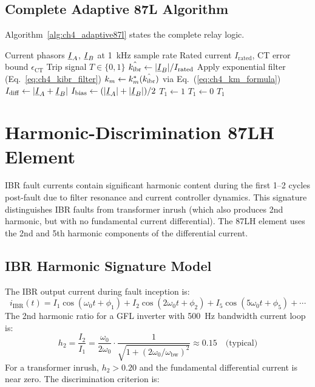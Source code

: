 \subsection{Complete Adaptive 87L Algorithm}

Algorithm~\ref{alg:ch4_adaptive87l} states the complete relay logic.

\begin{algorithm}[htbp]
\caption{Adaptive 87L Threshold (C1)}
\label{alg:ch4_adaptive87l}
\begin{algorithmic}[1]
\Require Current phasors $\underline{I}_A$, $\underline{I}_B$ at 1~kHz sample rate
\Require Rated current $I_\mathrm{rated}$, CT error bound $\epsilon_\mathrm{CT}$
\Ensure Trip signal $T \in \{0, 1\}$
\State $\hat{k_\mathrm{ibr}} \leftarrow |\underline{I}_B| / I_\mathrm{rated}$ 
\State Apply exponential filter (Eq.~\ref{eq:ch4_kibr_filter})
\State $k_m \leftarrow k_m^\ast(\hat{k_\mathrm{ibr}})$ via Eq.~(\ref{eq:ch4_km_formula})
\State $I_\mathrm{diff} \leftarrow |\underline{I}_A + \underline{I}_B|$
\State $I_\mathrm{bias} \leftarrow (|\underline{I}_A| + |\underline{I}_B|)/2$
  \State $T_1 \leftarrow 1$ 
\Else
  \State $T_1 \leftarrow 0$
\EndIf
\State \Return $T_1$
\end{algorithmic}
\end{algorithm}

\section{Harmonic-Discrimination 87LH Element}
\label{sec:ch4_harmonic}

IBR fault currents contain significant harmonic content during the first
1--2 cycles post-fault due to filter resonance and current controller
dynamics. This signature distinguishes IBR faults from transformer inrush
(which also produces 2nd harmonic, but with no fundamental current
differential). The 87LH element uses the 2nd and 5th harmonic components
of the differential current.

\subsection{IBR Harmonic Signature Model}

The IBR output current during fault inception is:
\begin{equation}
  i_\mathrm{IBR}(t) = I_1\cos(\omega_0 t + \phi_1)
    + I_2\cos(2\omega_0 t + \phi_2)
    + I_5\cos(5\omega_0 t + \phi_5) + \cdots
  \label{eq:ch4_ibr_harmonic}
\end{equation}
The 2nd harmonic ratio for a GFL inverter with 500~Hz bandwidth current
loop is:
\begin{equation}
  h_2 = \frac{I_2}{I_1} = \frac{\omega_0}{2\omega_0}
    \cdot \frac{1}{\sqrt{1 + (2\omega_0/\omega_\mathrm{bw})^2}}
  \approx 0.15 \quad \text{(typical)}
  \label{eq:ch4_h2_ratio}
\end{equation}
For a transformer inrush, $h_2 > 0.20$ and the fundamental differential
current is near zero. The discrimination criterion is:

